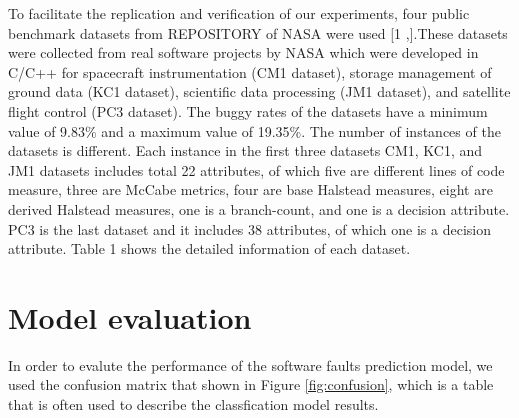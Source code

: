 \documentclass[runningheads,a4paper]{llncs}
\begin{document}
To facilitate the replication and verification of our experiments, four public benchmark datasets from REPOSITORY of NASA were used [1 ,].These datasets were collected from real software projects by NASA which were developed in C/C++ for spacecraft instrumentation (CM1 dataset), storage management of ground data (KC1 dataset), scientific data processing (JM1 dataset), and satellite flight control (PC3 dataset). The buggy rates of the datasets have a minimum value of 9.83\% and a maximum value of 19.35\%. The number of instances of the datasets is different. Each instance in the first three datasets CM1, KC1, and JM1 datasets includes total 22 attributes, of which five are different lines of code measure, three are McCabe metrics, four are base Halstead measures, eight are derived Halstead measures, one is a branch-count, and one is a decision attribute. PC3 is the last dataset and it includes 38 attributes, of which one is a decision attribute. Table 1 shows the detailed information of each dataset.


\begin{table}
\caption{Datasets Description}
\begin{centering}
\par\end{centering}

\end{table}




\section{Model evaluation}
\label{evaluation_criteria}
In order to evalute the performance of the software faults prediction model, we used the confusion matrix that shown in Figure \ref{fig:confusion}, which is a table that is often used to describe the classfication model results. 
\end{document}
